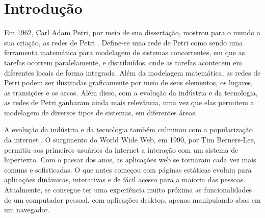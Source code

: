 \documentclass[
	12pt,				%
	openright,			%
	oneside,			%
	a4paper,			%
	english,			%
	brazil				%
	]{abntex2}
\theoremstyle{doispontos}
\begin{document}

\tableofcontents*
\cleardoublepage


\makeatletter
{}
\makeatother




\textual


\chapter[Introdução]{Introdução}

Em 1962, Carl Adam Petri, por meio de sua dissertação, mostrou para o mundo a sua criação, as redes de Petri \textcite{petri1962kommunikation}. Define-se uma rede de Petri como sendo uma ferramenta matemática para modelagem de sistemas concorrentes, em que as tarefas ocorrem paralelamente, e distribuídos, onde as tarefas acontecem em diferentes locais de forma integrada. Além da modelagem matemática, as redes de Petri podem ser ilustradas graficamente por meio de seus elementos, os lugares, as transições e os arcos. Além disso, com a evolução da indústria e da tecnologia, as redes de Petri ganharam ainda mais relevância, uma vez que elas permitem a modelagem de diversos tipos de sistemas, em diferentes áreas. 

A evolução da indústria e da tecnologia também culminou com a popularização da internet \textcite{lins2013evoluccao}. O surgimento do World Wide Web, em 1990, por Tim Berners-Lee, permitiu aos primeiros usuários da internet a interação com um sistema de hipertexto. Com o passar dos anos, as aplicações web se tornaram cada vez mais comuns e sofisticadas. O que antes começou com páginas estáticas evoluiu para aplicações dinâmicas, interativas e de fácil acesso para a maioria das pessoas. Atualmente, se consegue ter uma experiência muito próxima as funcionalidades de um computador pessoal, com aplicações desktop, apenas manipulando abas em um navegador.
\end{document}

